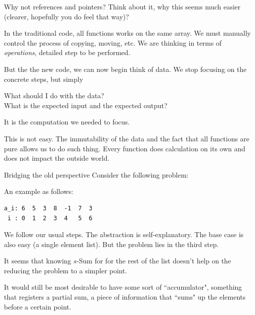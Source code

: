 \begin{frame}{Why not references and pointers?}
Think about it, why this seems much easier (clearer, hopefully you do feel that way)? 

In the traditional code, all functions works on the same array. We must manually control the process of copying, moving, etc. We are thinking in terms of \textit{operations}, detailed step to be performed.

But the the new code, we can now begin think of data. We stop focusing on the concrete steps, but simply
\begin{center}
	What should I do with the data? \\What is the expected input and the expected output?
\end{center} 
It is the computation we needed to focus. 

This is not easy. The immutability of the data and the fact that all functions are pure allows us to do such thing. Every function does calculation on its own and does not impact the outside world.
\end{frame}

\begin{frame}[fragile]{Bridging the old perspective}
Consider the following problem:

\vspace{0.1in}
\vspace{0.1in}

An example as follows:

\begin{verbatim}
a_i: 6  5  3  8  -1  7  3 
 i : 0  1  2  3  4   5  6
\end{verbatim}

We follow our usual steps. The abstraction is self-explanatory. The base case is also easy (a single element list). But the problem lies in the third step. 

It seems that knowing $s$-Sum for for the rest of the list doesn't help on the reducing the problem to a simpler point. 

It would still be most desirable to have some sort of ``accumulator", something that registers a partial sum, a piece of information that ``sums" up the elements before a certain point.
\end{frame}

